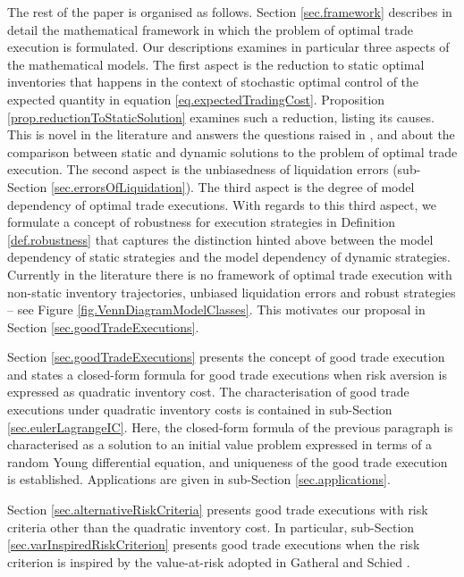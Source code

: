 \documentclass[10pt,a4paper]{article}
\begin{document}
\nocite{CJ19alg}
\nocite{HJN19mea}
\nocite{CDJ17alg}
\nocite{CJ19tra}


The rest of the paper is organised as follows. Section \ref{sec.framework} describes in detail the mathematical framework in which the problem of optimal trade execution is formulated. Our descriptions examines in particular three aspects of the mathematical models. The first aspect is the reduction to static optimal inventories that happens in the context of stochastic optimal control of the expected quantity in equation \eqref{eq.expectedTradingCost}.  Proposition \ref{prop.reductionToStaticSolution} examines such a reduction, listing its causes. This is novel in the literature and answers the questions raised in \cite{BD14opt}, \cite{BP18sta} and \cite{BBDN18sta}  about the comparison between static and dynamic solutions to the problem of optimal trade execution.  The second aspect is  the unbiasedness of liquidation errors (sub-Section \ref{sec.errorsOfLiquidation}). The third aspect is the degree of model dependency of optimal trade executions. With regards to this third aspect, we formulate a concept of robustness for execution strategies in Definition \ref{def.robustness} that captures the distinction hinted above between the model dependency of static strategies and the model dependency of dynamic strategies.
Currently in the literature there is no framework of optimal trade execution with non-static inventory trajectories, unbiased liquidation errors and robust strategies -- see Figure \ref{fig.VennDiagramModelClasses}. This motivates our proposal in Section \ref{sec.goodTradeExecutions}.  

Section \ref{sec.goodTradeExecutions} presents the concept of good trade execution and states a closed-form formula for good trade executions when risk aversion is expressed as quadratic inventory cost. The characterisation of good trade executions under quadratic inventory costs is contained in sub-Section \ref{sec.eulerLagrangeIC}. Here, the closed-form formula of the previous  paragraph is characterised as a solution to an initial value problem expressed in terms of a   random Young differential equation, and uniqueness of the good trade execution  is established. Applications are given in sub-Section \ref{sec.applications}.

Section \ref{sec.alternativeRiskCriteria} presents good trade executions with risk criteria other than the quadratic inventory cost. In particular, sub-Section \ref{sec.varInspiredRiskCriterion} presents good trade executions when the risk criterion is inspired by the value-at-risk adopted in Gatheral and Schied \cite{GS11opt}.    
\end{document}
